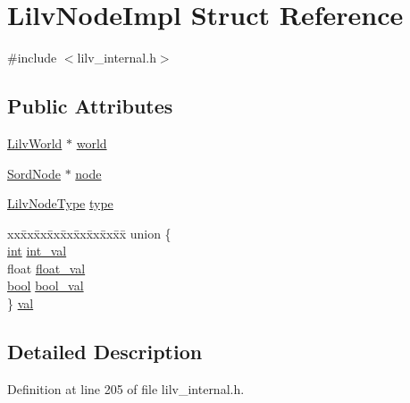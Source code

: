 \hypertarget{struct_lilv_node_impl}{}\section{Lilv\+Node\+Impl Struct Reference}
\label{struct_lilv_node_impl}


{\ttfamily \#include $<$lilv\+\_\+internal.\+h$>$}

\subsection*{Public Attributes}
\begin{DoxyCompactItemize}
\item 
\hyperlink{lilv_8h_a91c1745aa6ffca2b6b87c56df6c5ab86}{Lilv\+World} $\ast$ \hyperlink{struct_lilv_node_impl_ad5dad43f2a5a7fd3f20f4474db93508c}{world}
\item 
\hyperlink{group__sord_ga804ac7d56d9fdea50f2d1e7278b1f82b}{Sord\+Node} $\ast$ \hyperlink{struct_lilv_node_impl_a10b31ad2e47d09fcb23089c5706e84c0}{node}
\item 
\hyperlink{lilv__internal_8h_a21e43999c8cf40e85363d0e848eb6536}{Lilv\+Node\+Type} \hyperlink{struct_lilv_node_impl_a0aa1bfe76dbd81a2ede605dbb93b0dc1}{type}
\item 
\begin{tabbing}
xx\=xx\=xx\=xx\=xx\=xx\=xx\=xx\=xx\=\kill
union \{\\
\>\hyperlink{xmltok_8h_a5a0d4a5641ce434f1d23533f2b2e6653}{int} \hyperlink{struct_lilv_node_impl_aab7e8d7b76fd5bd1cf7c99c3262ff959}{int\_val}\\
\>float \hyperlink{struct_lilv_node_impl_a73d438924503dfcf0935be5c925a0172}{float\_val}\\
\>\hyperlink{mac_2config_2i386_2lib-src_2libsoxr_2soxr-config_8h_abb452686968e48b67397da5f97445f5b}{bool} \hyperlink{struct_lilv_node_impl_ae0425c0f22aa7235a5f5ada6d82638be}{bool\_val}\\
\} \hyperlink{struct_lilv_node_impl_a41960922e4be49a41b54aa7655e679e2}{val}\\

\end{tabbing}\end{DoxyCompactItemize}


\subsection{Detailed Description}


Definition at line 205 of file lilv\+\_\+internal.\+h.



